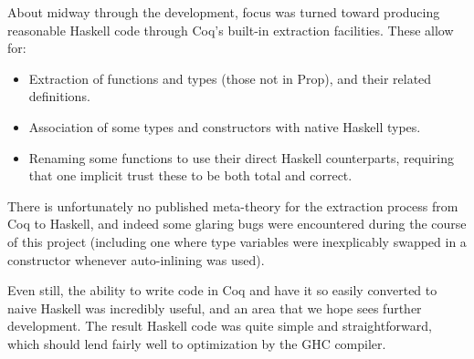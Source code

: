 \documentclass{llncs}
\begin{document}
About midway through the development, focus was turned toward producing
reasonable Haskell code through Coq's built-in extraction facilities.  These
allow for:

\begin{itemize}
\item Extraction of functions and types (those not in Prop), and their related
  definitions.

\item Association of some types and constructors with native Haskell types.

\item Renaming some functions to use their direct Haskell counterparts,
  requiring that one implicit trust these to be both total and correct.
\end{itemize}

There is unfortunately no published meta-theory for the extraction process
from Coq to Haskell, and indeed some glaring bugs were encountered during the
course of this project (including one where type variables were inexplicably
swapped in a constructor whenever auto-inlining was used).

Even still, the ability to write code in Coq and have it so easily converted
to naive Haskell was incredibly useful, and an area that we hope sees further
development.  The result Haskell code was quite simple and straightforward,
which should lend fairly well to optimization by the GHC compiler.



\end{document}
